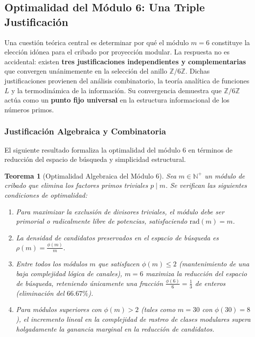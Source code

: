 \documentclass{article}
\numberwithin{equation}{section}
\theoremstyle{plain}
\newtheorem{theorem}{Teorema}[section]
\theoremstyle{definition}
\begin{document}

\subsection{Optimalidad del Módulo 6: Una Triple Justificación}
\label{subsec:optimalidad-modulo6}

Una cuestión teórica central es determinar por qué el módulo $m = 6$ constituye la elección idónea para el cribado por proyección modular. La respuesta no es accidental: existen \textbf{tres justificaciones independientes y complementarias} que convergen unánimemente en la selección del anillo $\mathbb{Z}/6\mathbb{Z}$. Dichas justificaciones provienen del análisis combinatorio, la teoría analítica de funciones $L$ y la termodinámica de la información. Su convergencia demuestra que $\mathbb{Z}/6\mathbb{Z}$ actúa como un \textbf{punto fijo universal} en la estructura informacional de los números primos.

\subsubsection{Justificación Algebraica y Combinatoria}

El siguiente resultado formaliza la optimalidad del módulo 6 en términos de reducción del espacio de búsqueda y simplicidad estructural.

\begin{theorem}[Optimalidad Algebraica del Módulo 6]
\label{thm:optimalidad-algebraica}
Sea $m \in \mathbb{N}^+$ un módulo de cribado que elimina los factores primos triviales $p \mid m$. Se verifican las siguientes condiciones de optimalidad:
\begin{enumerate}
    \item Para maximizar la exclusión de divisores triviales, el módulo debe ser primorial o radicalmente libre de potencias, satisfaciendo $\mathrm{rad}(m) = m$.
    \item La densidad de candidatos preservados en el espacio de búsqueda es $\rho(m) = \frac{\phi(m)}{m}$.
    \item Entre todos los módulos $m$ que satisfacen $\phi(m) \le 2$ (mantenimiento de una baja complejidad lógica de canales), $m = 6$ maximiza la reducción del espacio de búsqueda, reteniendo únicamente una fracción $\frac{\phi(6)}{6} = \frac{1}{3}$ de enteros (eliminación del $66.67\%$).
    \item Para módulos superiores con $\phi(m) > 2$ (tales como $m=30$ con $\phi(30)=8$), el incremento lineal en la complejidad de rastreo de clases modulares supera holgadamente la ganancia marginal en la reducción de candidatos.
\end{enumerate}
\end{theorem}
\end{document}
